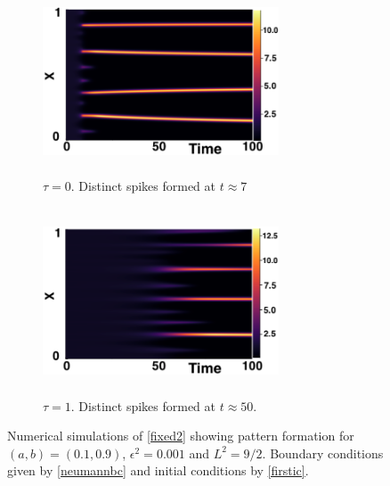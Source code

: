 \begin{figure}[H]
    \centering
    \begin{subfigure}[b]{0.45\textwidth}
        \centering
        \includegraphics[width=7cm,height = 5.5cm]{patt1.png}
        \caption{$\tau=0$. Distinct spikes formed at $t\approx7$ }
        \label{}
    \end{subfigure}
    \hfill
    \begin{subfigure}[b]{0.45\textwidth}
        \centering
        \includegraphics[width=7cm,height = 5.5cm]{patt2.png}
        \caption{$\tau=1$. Distinct spikes formed at $t\approx50$.}
        \label{}
    \end{subfigure}
    \caption{Numerical simulations of \eqref{fixed2} showing pattern formation for $(a,b)=(0.1,0.9)$, $\epsilon^2=0.001$ and $L^2=9/2$. Boundary conditions given by \eqref{neumannbc} and initial conditions by \eqref{firstic}.}
    \label{fig:fixedsim2}
\end{figure}

